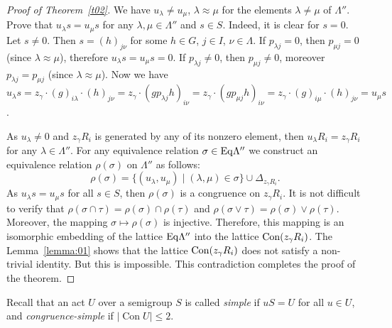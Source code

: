 \documentclass{birkau}
\numberwithin{equation}{section}
\theoremstyle{plain}
\theoremstyle{definition}
\DeclareMathOperator{\Con}{Con}
\begin{document}
\begin{proof}[Proof of Theorem~\ref{t02}]
        We have $u_\lambda \ne u_\mu$, $\lambda \approx \mu$ for the elements $\lambda \ne \mu$ of $\Lambda''$. Prove that $u_\lambda s=u_\mu s$ for any $\lambda, \mu \in \Lambda''$ and $s\in S$. Indeed, it is clear for $s=0$. Let $s\ne 0$. Then $s=(h)_{j\nu}$ for some $h\in G$, $j\in I$, $\nu \in \Lambda$. If $p_{\lambda j}=0$, then $p_{\mu j}=0$ (since $\lambda \approx \mu$), therefore $u_\lambda s=u_\mu s=0$. If $p_{\lambda j}\ne 0$, then $p_{\mu j} \ne 0$, moreover $p_{\lambda j}=p_{\mu j}$ (since $\lambda \approx \mu$). Now we have $u_\lambda s=z_\gamma\cdot (g)_{i\lambda} \cdot (h)_{j\nu} = z_\gamma\cdot (gp_{\lambda j}h)_{i\nu} = z_\gamma \cdot (gp_{\mu j}h)_{i\nu} = z_\gamma \cdot (g)_{i\mu} \cdot (h)_{j\nu} =u_\mu s$.

        As $u_\lambda \ne 0$ and $z_\gamma R_i$ is generated by any of its nonzero element, then $u_\lambda R_i = z_\gamma R_i$ for any $\lambda \in \Lambda''$. For any equivalence relation $\sigma \in {\rm Eq}\Lambda''$ we construct an equivalence relation $\rho(\sigma)$ on $\Lambda''$ as follows: $$ \rho(\sigma)=\{ (u_\lambda,u_\mu) \mid (\lambda,\mu)\in \sigma \} \cup \Delta_{z_\gamma R_i}.  $$ As $u_\lambda s=u_\mu s$ for all $s\in S$, then $\rho(\sigma)$ is a congruence on $z_\gamma R_i$. It is not difficult to verify that $\rho (\sigma \cap \tau) =\rho(\sigma) \cap \rho(\tau)$ and $\rho (\sigma \vee \tau) =\rho(\sigma) \vee \rho(\tau)$. Moreover, the mapping $\sigma \mapsto \rho(\sigma)$ is injective. Therefore, this mapping is an isomorphic embedding of the lattice ${\rm Eq}\Lambda''$ into the lattice ${\rm Con}(z_\gamma R_i)$.   The Lemma~\ref{lemma:01} shows that the lattice ${\rm Con}(z_\gamma R_i)$ does not satisfy a non-trivial identity. But this is impossible. This contradiction completes the proof of the theorem.
	\end{proof}
	
	Recall that an act $U$ over a semigroup $S$ is called \textit{simple} if $uS = U$ for all $ u \in U$, and \textit{congruence-simple} if $|\Con U| \leqslant 2$.
	
\end{document}

